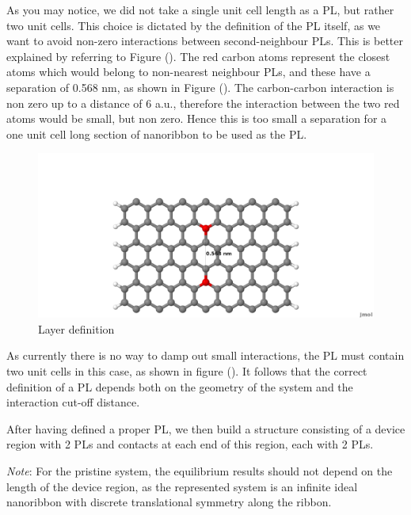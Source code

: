 \documentclass[a4paper,11pt,english]{sphinxmanual}
\begin{document}
{{As you may notice, we did not take a single unit cell length as a PL,
but rather two unit cells. This choice is dictated by the definition
of the PL itself, as we want to avoid non-zero interactions between
second-neighbour PLs. This is better explained by referring to Figure
{\hyperref[transport:fig-4cell-7]{\emph{}}} (). The red carbon atoms represent the closest atoms
which would belong to non-nearest neighbour PLs, and these have a
separation of 0.568 nm, as shown in Figure {\hyperref[transport:fig-4cell-7]{\emph{}}} (). The
carbon-carbon interaction is non zero up to a distance of 6 a.u.,
therefore the interaction between the two red atoms would be small,
but non zero. Hence this is too small a separation for a one unit cell
long section of nanoribbon to be used as the PL.
\begin{figure}[htbp]
\centering
\capstart

\includegraphics[width=0.800\linewidth]{4cell_7.png}
\caption{Layer definition}\label{transport:fig-4cell-7}\end{figure}

As currently there is no way to damp out small interactions, the PL
must contain two unit cells in this case, as shown in figure
{\hyperref[transport:fig-4cell-7]{\emph{}}} (). It follows that the correct definition of a PL
depends both on the geometry of the system and the interaction cut-off
distance.

After having defined a proper PL, we then build a structure consisting
of a device region with 2 PLs and contacts at each end of this region,
each with 2 PLs.

\emph{Note}: For the pristine system, the equilibrium results should not
depend on the length of the device region, as the represented system
is an infinite ideal nanoribbon with discrete translational symmetry
along the ribbon.

}}
\end{document}
